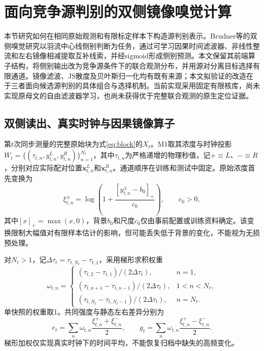 
\section{面向竞争源判别的双侧镜像嗅觉计算}
\label{sec:m1}

本节研究如何在相同原始观测和有限标定样本下构造源判别表示。Brudner等的双侧嗅觉研究以羽流中心线侧别判断为任务，通过可学习因果时间滤波器、非线性整流和左右镜像相减提取互补线索，并经sigmoid形成侧别预测。本文保留其前端算子结构，将侧别输出改为竞争源条件下的联合观测分布，并用源对分离目标选择有限通道。镜像滤波、JS散度及贝叶斯归一化均有既有来源；本文拟验证的改造在于三者面向候选源判别的具体组合与选择机制。当前实现采用固定有限核库，尚未实现原母文的自由滤波器学习，也尚未获得优于完整联合观测的原生定位证据。

\subsection{双侧读出、真实时钟与因果镜像算子}

第$t$次同步测量的完整原始块为式\eqref{eq:block}的$X_t$。M1取其浓度与时钟投影$W_t=\{(\tau_{t,n},y_{t,n}^{L},y_{t,n}^{R})\}_{n=1}^{N_t}$，其中$\tau_{t,n}$为严格递增的物理秒值，记$+\equiv L$、$-\equiv R$，分别对应实际配对位置$\mathbf x_{t,n}^{L}$和$\mathbf x_{t,n}^{R}$。通道顺序在训练和测试中固定。原始浓度首先变换为
\begin{equation}
\xi_{t,n}^{\pm}=\log\!\left(1+\frac{[y_{t,n}^{\pm}-b_0]_+}{c_0}\right),\qquad c_0>0,
\label{eq:m1_preprocess}
\end{equation}
其中$[x]_+=\max(x,0)$，背景$b_0$和尺度$c_0$仅由事前配置或训练资料确定。该变换限制大幅值对有限样本估计的影响，但可能丢失低于背景的变化，不能视为无损预处理。

对$N_t>1$，记$\Delta\tau_t=\tau_{t,N_t}-\tau_{t,1}$，采用梯形求积权重
\begin{equation}
\omega_{t,n}=\begin{cases}
(\tau_{t,2}-\tau_{t,1})/(2\Delta\tau_t),&n=1,\\
(\tau_{t,n+1}-\tau_{t,n-1})/(2\Delta\tau_t),&1<n<N_t,\\
(\tau_{t,N_t}-\tau_{t,N_t-1})/(2\Delta\tau_t),&n=N_t.
\end{cases}
\label{eq:m1_time_weights}
\end{equation}
单快照的权重取1。共同强度与静态左右差异分别为
\begin{equation}
e_t=\sum_n\omega_{t,n}\frac{\xi_{t,n}^{+}+\xi_{t,n}^{-}}2,
\qquad
g_t=\sum_n\omega_{t,n}\frac{\xi_{t,n}^{+}-\xi_{t,n}^{-}}2.
\label{eq:m1_even_gradient}
\end{equation}
梯形加权仅实现真实时钟下的时间平均，不能恢复归档中缺失的高频变化。

